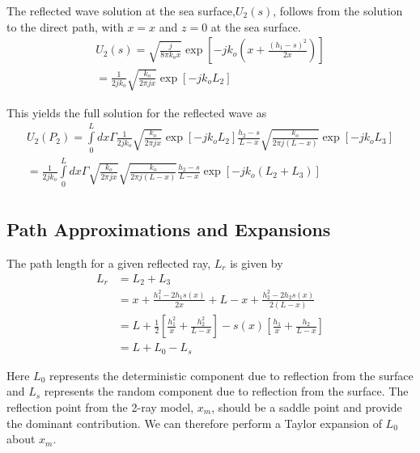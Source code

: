 The reflected wave solution at the sea surface,$U_2(s)$, follows from the solution to the direct path, with $x = x$ and $z = 0$ at the sea surface.
\begin{equation}
\begin{gathered}
U_2(s) = \sqrt{\frac{j}{8\pi k_ox}}\exp\left[-jk_o\left(x + \frac{(h_1-s)^2}{2x}\right) \right]\\
= \frac{1}{2jk_o}\sqrt{\frac{k_o}{2\pi jx}}\exp\left[-jk_oL_2\right]
\end{gathered}
\label{mp_eq:11ae}
\end{equation}
\renewcommand{\baselinestretch}{2} \small\normalsize

This yields the full solution for the reflected wave as 
\begin{equation}
\begin{gathered}
U_2(P_2) = \int\limits_{0}^{L}dx\Gamma \frac{1}{2jk_o}\sqrt{\frac{k_o}{2\pi jx}}\exp\left[-jk_oL_2\right]\frac{h_2-s}{L-x}\sqrt{\frac{k_o}{2\pi j (L-x)}}\exp\left[-jk_oL_3 \right]  \\
= \frac{1}{2jk_o}\int\limits_{0}^{L}dx\Gamma \sqrt{\frac{k_o}{2\pi jx}}\sqrt{\frac{k_o}{2\pi j (L-x)}}\frac{h_2-s}{L-x}\exp\left[-jk_o\left( L_2 + L_3\right) \right]  \\
\label{mp_eq:12g}
\end{gathered}
\end{equation}
\renewcommand{\baselinestretch}{2} \small\normalsize

\subsection{Path Approximations and Expansions}
The path length for a given reflected ray, $L_r$ is given by
\begin{equation}
\begin{aligned}
L_r &= L_2 + L_3 \\
& = x + \frac{h_1^2-2h_1s(x)}{2x} +  L-x + \frac{h_2^2 - 2h_2s(x)}{2\left(L-x\right)} \\
& = L + \frac{1}{2}\left[\frac{h_1^2}{x} + \frac{h_2^2}{L-x} \right] - s(x)\left[ \frac{h_1}{x} + \frac{h_2}{L-x}\right] \\
&= L + L_0 - L_s
\end{aligned}
\label{mp_eq:13}
\end{equation}
\renewcommand{\baselinestretch}{2} \small\normalsize

Here $L_0$ represents the deterministic component due to reflection from the surface and $L_s$ represents the random component due to reflection from the surface. The reflection point from the 2-ray model, $x_m$, should be a saddle point and provide the dominant contribution. We can therefore perform a Taylor expansion of $L_0$ about $x_m$.

